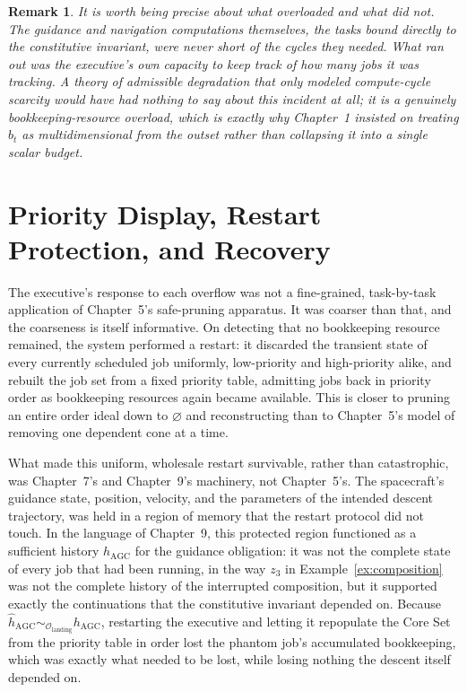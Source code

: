 \documentclass[11pt]{report}
\newtheorem{remark}[definition]{Remark}
\begin{document}
\begin{remark}
It is worth being precise about what overloaded and what did not. The guidance and navigation computations themselves, the tasks bound directly to the constitutive invariant, were never short of the cycles they needed. What ran out was the executive's own capacity to keep track of how many jobs it was tracking. A theory of admissible degradation that only modeled compute-cycle scarcity would have had nothing to say about this incident at all; it is a genuinely bookkeeping-resource overload, which is exactly why Chapter~1 insisted on treating $b_t$ as multidimensional from the outset rather than collapsing it into a single scalar budget.
\end{remark}

\chapter{Priority Display, Restart Protection, and Recovery}

The executive's response to each overflow was not a fine-grained, task-by-task application of Chapter~5's safe-pruning apparatus. It was coarser than that, and the coarseness is itself informative. On detecting that no bookkeeping resource remained, the system performed a restart: it discarded the transient state of every currently scheduled job uniformly, low-priority and high-priority alike, and rebuilt the job set from a fixed priority table, admitting jobs back in priority order as bookkeeping resources again became available. This is closer to pruning an entire order ideal down to $\varnothing$ and reconstructing than to Chapter~5's model of removing one dependent cone at a time.

What made this uniform, wholesale restart survivable, rather than catastrophic, was Chapter~7's and Chapter~9's machinery, not Chapter~5's. The spacecraft's guidance state, position, velocity, and the parameters of the intended descent trajectory, was held in a region of memory that the restart protocol did not touch. In the language of Chapter~9, this protected region functioned as a sufficient history $\widehat h_{\mathrm{AGC}}$ for the guidance obligation: it was not the complete state of every job that had been running, in the way $z_3$ in Example~\ref{ex:composition} was not the complete history of the interrupted composition, but it supported exactly the continuations that the constitutive invariant depended on. Because $\widehat h_{\mathrm{AGC}} \sim_{\mathcal O_{\mathrm{landing}}} h_{\mathrm{AGC}}$, restarting the executive and letting it repopulate the Core Set from the priority table in order lost the phantom job's accumulated bookkeeping, which was exactly what needed to be lost, while losing nothing the descent itself depended on.
\end{document}
